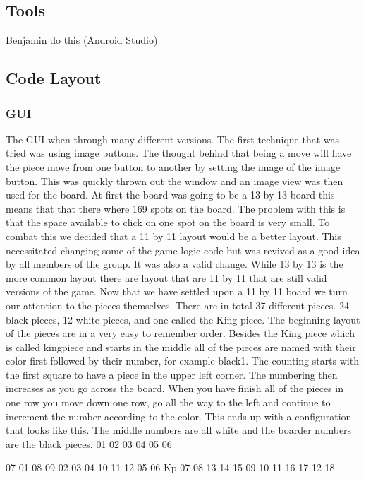 \documentclass{article}
\begin{document}
\subsection{Tools}
Benjamin do this (Android Studio)

\subsection{Code Layout}

\subsubsection{GUI}
	The GUI when through many different versions. The first technique that was tried was using image buttons. The thought behind that being a move will have the piece move from one button to another by setting the image of the image button. This was quickly thrown out the window and an image view was then used for the board. At first the board was going to be a 13 by 13 board this means that that there where 169 spots on the board. The problem with this is that the space available to click on one spot on the board is very small. To combat this we decided that a 11 by 11 layout would be a better layout. This necessitated changing some of the game logic code but was revived as a good idea by all members of the group. It was also a valid change. While 13 by 13 is the more common layout there are layout that are 11 by 11 that are still valid versions of the game. 
	Now that we have settled upon a 11 by 11 board we turn our attention to the pieces themselves. There are in total 37 different pieces. 24 black pieces, 12 white pieces, and one called the King piece.  The beginning layout of the pieces are in a very easy to remember order. Besides the King piece which is called kingpiece and starts in the middle all of the pieces are named with their color first followed by their number, for example black1. The counting starts with the first square to have a piece in the upper left corner. The numbering then increases as you go across the board. When you have finish all of the pieces in one row you move down one row, go all the way to the left and continue to increment the number according to the color. This ends up with a configuration that looks like this. The middle numbers are all white and the boarder numbers are the black pieces.
        01 02 03 04 05
              06
      
07            01            08
09         02 03 04         10
11 12   05 06 Kp 07 08   13 14
15         09 10 11         16
17            12            18
\end{document}

